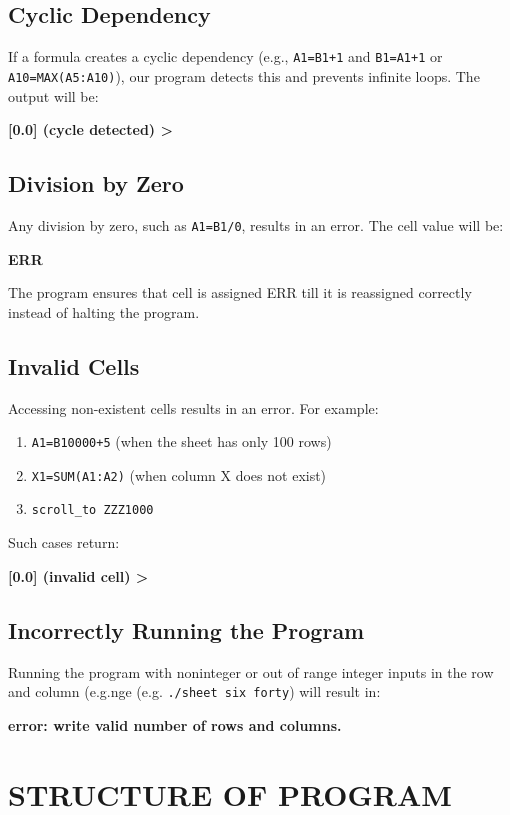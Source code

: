 \documentclass[a4paper]{article}
\begin{document}
\subsection{Cyclic Dependency}
If a formula creates a cyclic dependency (e.g., \texttt{A1=B1+1} and \texttt{B1=A1+1} or \texttt{A10=MAX(A5:A10)}), our program detects this and prevents infinite loops. The output will be:
\begin{center}
    \textbf{[0.0] (cycle detected) >}
\end{center}

\subsection{Division by Zero}
Any division by zero, such as \texttt{A1=B1/0}, results in an error. The cell value will be:
\begin{center}
    \textbf{ERR}
\end{center}
The program ensures that cell is assigned ERR till it is reassigned correctly instead of halting the program.

\subsection{Invalid Cells}
Accessing non-existent cells results in an error. For example:
\begin{enumerate}
    \item \texttt{A1=B10000+5} (when the sheet has only 100 rows)
    \item \texttt{X1=SUM(A1:A2)} (when column X does not exist)
    \item \texttt{scroll\_to ZZZ1000} 
\end{enumerate}
Such cases return:
\begin{center}
    \textbf{[0.0] (invalid cell) >}
\end{center}

\subsection{Incorrectly Running the Program}
Running the program with noninteger or out of range integer inputs in the row and column (e.g.nge (e.g. \texttt{./sheet six forty}) will result in:
\begin{center}
    \textbf{error: write valid number of rows and columns.}
\end{center}



\section{STRUCTURE OF PROGRAM}
\end{document}
